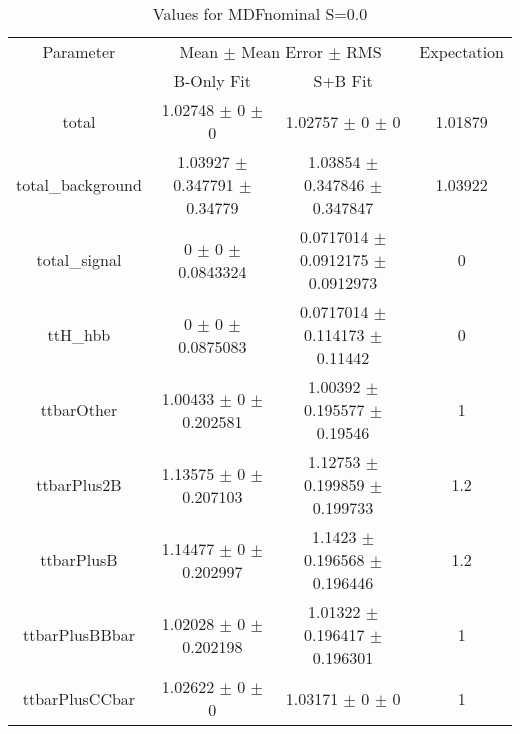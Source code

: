 \begin{table}
\centering
\caption{Values for MDFnominal S=0.0}
\begin{tabular}{cccc}
\toprule
Parameter & \multicolumn{2}{c}{Mean $\pm$ Mean Error $\pm$ RMS} & Expectation\\
 & B-Only Fit & S+B Fit & \\
\midrule
total & \num{1.02748} $\pm$ \num{0} $\pm$ \num{0} & \num{1.02757} $\pm$ \num{0} $\pm$ \num{0} & \num{1.01879}\\
total\_background & \num{1.03927} $\pm$ \num{0.347791} $\pm$ \num{0.34779} & \num{1.03854} $\pm$ \num{0.347846} $\pm$ \num{0.347847} & \num{1.03922}\\
total\_signal & \num{0} $\pm$ \num{0} $\pm$ \num{0.0843324} & \num{0.0717014} $\pm$ \num{0.0912175} $\pm$ \num{0.0912973} & \num{0}\\
ttH\_hbb & \num{0} $\pm$ \num{0} $\pm$ \num{0.0875083} & \num{0.0717014} $\pm$ \num{0.114173} $\pm$ \num{0.11442} & \num{0}\\
ttbarOther & \num{1.00433} $\pm$ \num{0} $\pm$ \num{0.202581} & \num{1.00392} $\pm$ \num{0.195577} $\pm$ \num{0.19546} & \num{1}\\
ttbarPlus2B & \num{1.13575} $\pm$ \num{0} $\pm$ \num{0.207103} & \num{1.12753} $\pm$ \num{0.199859} $\pm$ \num{0.199733} & \num{1.2}\\
ttbarPlusB & \num{1.14477} $\pm$ \num{0} $\pm$ \num{0.202997} & \num{1.1423} $\pm$ \num{0.196568} $\pm$ \num{0.196446} & \num{1.2}\\
ttbarPlusBBbar & \num{1.02028} $\pm$ \num{0} $\pm$ \num{0.202198} & \num{1.01322} $\pm$ \num{0.196417} $\pm$ \num{0.196301} & \num{1}\\
ttbarPlusCCbar & \num{1.02622} $\pm$ \num{0} $\pm$ \num{0} & \num{1.03171} $\pm$ \num{0} $\pm$ \num{0} & \num{1}\\
\bottomrule
\end{tabular}
\end{table}